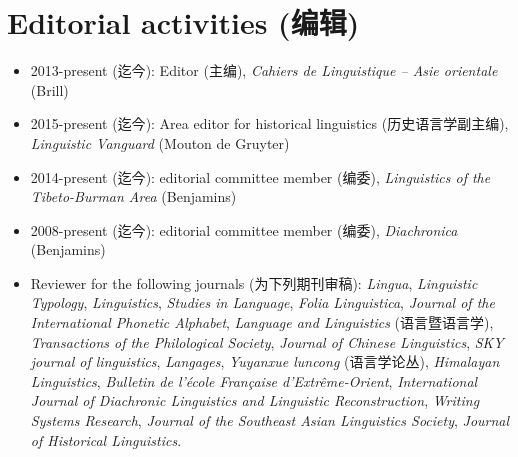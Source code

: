 \documentclass[oldfontcommands,oneside,a4paper,11pt]{article}
\newcommand{\zh}[1]{{\cn #1}}
\newcommand{\lingua}[3]{#2 (\zh{#3})}
\begin{document}
\section*{\lingua{Activités éditoriales}{Editorial activities}{编辑}}
\begin{itemize}
\item 2013-\lingua{présent}{present}{迄今}: \lingua{Rédacteur en chef}{Editor}{主编}, \textit{Cahiers de Linguistique -- Asie orientale} (Brill)
\item 2015-\lingua{présent}{present}{迄今}: \lingua{Area editor pour la linguistique historique}{Area editor for historical linguistics}{历史语言学副主编},  \textit{Linguistic Vanguard} (Mouton de Gruyter)
\item 2014-\lingua{présent}{present}{迄今}: \lingua{membre du comité éditorial}{editorial committee member}{编委},  \textit{Linguistics of the Tibeto-Burman Area}  (Benjamins)
\item 2008-\lingua{présent}{present}{迄今}: \lingua{membre du comité éditorial}{editorial committee member}{编委},  \textit{Diachronica} (Benjamins)
\item \lingua{Relecteur pour les revues suivantes (en plus des précédentes)}{Reviewer for the following journals}{为下列期刊审稿}: \textit{Lingua}, \textit{Linguistic Typology}, \textit{Linguistics}, \textit{Studies in Language}, \textit{Folia Linguistica}, \textit{Journal of the International Phonetic Alphabet},  \textit{Language and Linguistics} (\zh{语言暨语言学}), \textit{Transactions of the Philological Society}, \textit{Journal of Chinese Linguistics}, \textit{SKY journal of linguistics}, \textit{Langages}, \textit{Yuyanxue luncong} (\zh{语言学论丛}), 	\textit{Himalayan Linguistics}, \textit{Bulletin de l’école Française d’Extrême-Orient}, 	\textit{International Journal of Diachronic Linguistics and Linguistic Reconstruction}, \textit{Writing Systems Research}, 	\textit{Journal of the Southeast Asian Linguistics Society}, \textit{Journal of Historical Linguistics}.
\end{itemize}
\end{document}
